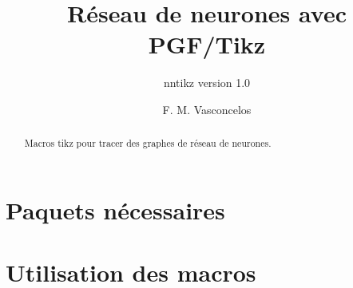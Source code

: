 \documentclass[a4paper,9pt]{article}
\title{Réseau de neurones avec PGF/Tikz}
\subtitle{nntikz version 1.0}
\author{F. M. Vasconcelos}
\date{}
\begin{document}
\maketitle
\begin{abstract}
Macros tikz pour tracer des graphes de réseau de neurones. 
\end{abstract}


\section{Paquets nécessaires}

\section{Utilisation des macros}

\begin{center}
\end{center}
\end{document}
